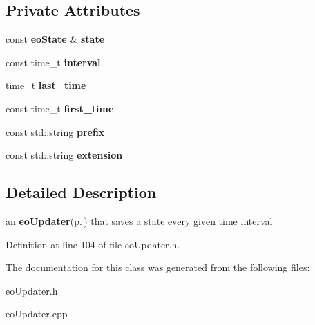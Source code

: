 \subsection*{Private Attributes}
\begin{CompactItemize}
\item 
const {\bf eo\-State} \& {\bf state}\label{classeo_timed_state_saver_r0}

\item 
const time\_\-t {\bf interval}\label{classeo_timed_state_saver_r1}

\item 
time\_\-t {\bf last\_\-time}\label{classeo_timed_state_saver_r2}

\item 
const time\_\-t {\bf first\_\-time}\label{classeo_timed_state_saver_r3}

\item 
const std::string {\bf prefix}\label{classeo_timed_state_saver_r4}

\item 
const std::string {\bf extension}\label{classeo_timed_state_saver_r5}

\end{CompactItemize}


\subsection{Detailed Description}
an {\bf eo\-Updater}{\rm (p.\,\pageref{classeo_updater})} that saves a state every given time interval 



Definition at line 104 of file eo\-Updater.h.

The documentation for this class was generated from the following files:\begin{CompactItemize}
\item 
eo\-Updater.h\item 
eo\-Updater.cpp\end{CompactItemize}
